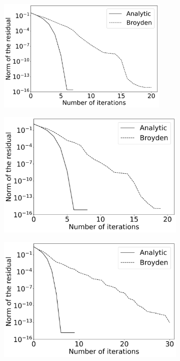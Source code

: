 \begin{figure}[H]
	\centering
	\begin{subfigure}{0.32\textwidth}
		\centering
		\includegraphics[width=0.9\textwidth]{images/NewtonIterationConvergence5Elements.png}
	\end{subfigure} 
	\begin{subfigure}{0.32\textwidth}
		\centering
		\includegraphics[width=1\textwidth]{images/NewtonIterationConvergence40Elements.png}
	\end{subfigure}
	\begin{subfigure}{0.32\textwidth}
		\centering
		\includegraphics[width=1\textwidth]{images/NewtonIterationConvergence200Elements.png}

\end{subfigure}
\end{figure}
